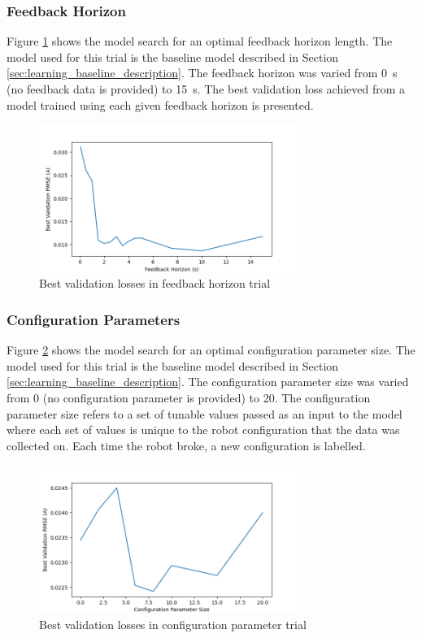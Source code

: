 \subsubsection{Feedback Horizon}
Figure \ref{fig:feedback_horizon} shows the model search for an optimal feedback horizon length. The model used for this trial is the baseline model described in Section \ref{sec:learning_baseline_description}. The feedback horizon was varied from \SI{0}{s} (no feedback data is provided) to \SI{15}{s}. The best validation loss achieved from a model trained using each given feedback horizon is presented. 

\begin{figure}[h]
    \centering
    \includegraphics[width=0.75\textwidth]{images/feedback_horizon.png}
    \caption{Best validation losses in feedback horizon trial}
    \label{fig:feedback_horizon}
\end{figure}


\subsubsection{Configuration Parameters}
Figure \ref{fig:configuration_size} shows the model search for an optimal configuration parameter size. The model used for this trial is the baseline model described in Section \ref{sec:learning_baseline_description}. The configuration parameter size was varied from 0 (no configuration parameter is provided) to 20. The configuration parameter size refers to a set of tunable values passed as an input to the model where each set of values is unique to the robot configuration that the data was collected on. Each time the robot broke, a new configuration is labelled.

\begin{figure}[h]
    \centering
    \includegraphics[width=0.75\textwidth]{images/configuration_size.png}
    \caption{Best validation losses in configuration parameter trial}
    \label{fig:configuration_size}
\end{figure}


